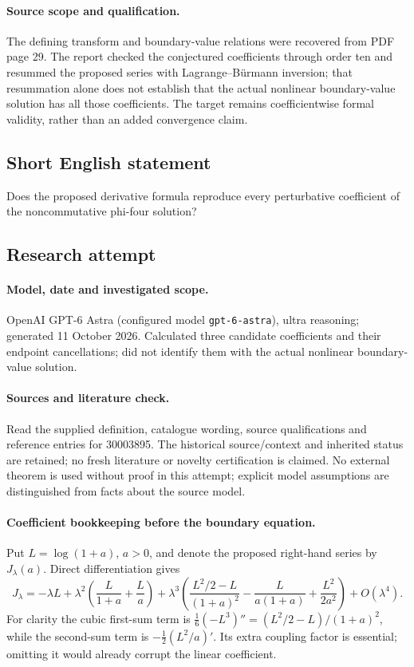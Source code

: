 \documentclass[11pt]{article}
\begin{document}
\paragraph{Source scope and qualification.}
The defining transform and boundary-value relations were recovered from PDF page 29. The report checked the conjectured coefficients through order ten and resummed the proposed series with Lagrange--B\"urmann inversion; that resummation alone does not establish that the actual nonlinear boundary-value solution has all those coefficients. The target remains coefficientwise formal validity, rather than an added convergence claim.
\subsection{Short English statement}
Does the proposed derivative formula reproduce every perturbative coefficient of the noncommutative phi-four solution?
\subsection{Research attempt}
\paragraph{Model, date and investigated scope.}
OpenAI GPT-6 Astra (configured model \texttt{gpt-6-astra}), ultra reasoning; generated 11 October 2026. Calculated three candidate coefficients and their endpoint cancellations; did not identify them with the actual nonlinear boundary-value solution.

\paragraph{Sources and literature check.}
Read the supplied definition, catalogue wording, source qualifications and reference entries for 30003895. The historical source/context and inherited status are retained; no fresh literature or novelty certification is claimed. No external theorem is used without proof in this attempt; explicit model assumptions are distinguished from facts about the source model.

\paragraph{Coefficient bookkeeping before the boundary equation.} Put \(L=\log(1+a)\), \(a>0\), and denote the proposed right-hand series by \(J_\lambda(a)\). Direct differentiation gives
\[
 J_\lambda=-\lambda L+\lambda^2\left(\frac{L}{1+a}+\frac{L}{a}\right)
 +\lambda^3\left(\frac{L^2/2-L}{(1+a)^2}-\frac{L}{a(1+a)}+\frac{L^2}{2a^2}\right)+O(\lambda^4).
\]
For clarity the cubic first-sum term is \(\frac16(-L^3)''=(L^2/2-L)/(1+a)^2\), while the second-sum term is \(-\frac12(L^2/a)'\). Its extra coupling factor is essential; omitting it would already corrupt the linear coefficient.
\end{document}
